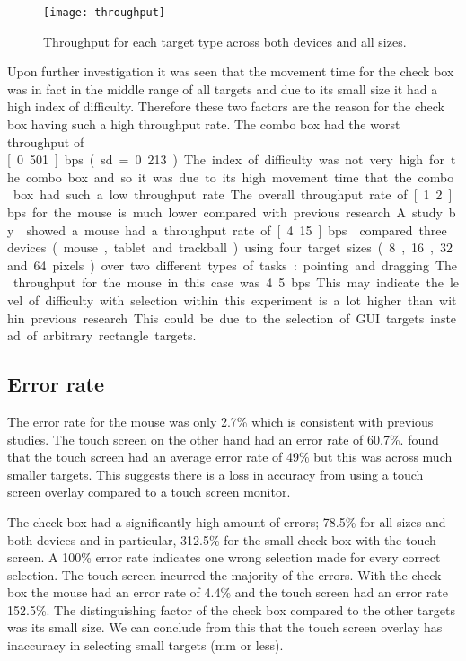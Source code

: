 \documentclass{elsart}
\begin{document}
\begin{figure}
	\texttt{[image: throughput]}
	\caption{Throughput for each target type across both devices and all
	sizes.}
	\label{fig-throughput}
\end{figure}

Upon further investigation it was seen that the movement time for the
check box was in fact in the middle range of all targets and due to its
small size it had a high index of difficulty. Therefore these two
factors are the reason for the check box having such a high throughput
rate. The combo box had the worst throughput of \unit[0.501]{bps} (sd =
0.213). The index of difficulty was not very high for the combo box and
so it was due to its high movement time that the combo box had such a
low throughput rate.

The overall throughput rate of \unit[1.2]{bps} for the mouse is much
lower compared with previous research. A study by
\citet{Doug-SA-1994-SIGCHI} showed a mouse had a throughput rate of
\unit[4.15]{bps}. \citet{Mack-IS-1991} compared three devices (mouse,
tablet and trackball) using four target sizes (8, 16, 32 and 64 pixels)
over two different types of tasks: pointing and dragging. The throughput
for the mouse in this case was 4.5 bps. This may indicate the level of
difficulty with selection within this experiment is a lot higher than
within previous research. This could be due to the selection of GUI
targets instead of arbitrary rectangle targets.

\subsection{Error rate}
\label{sec-results-errorrate}

The error rate for the mouse was only 2.7\% which is consistent with
previous studies. The touch screen on the other hand had an error rate
of 60.7\%. \citet{Sear-A-1991-IJMMS} found that the touch screen had
an average error rate of 49\% but this was across much smaller targets.
This suggests there is a loss in accuracy from using a touch screen
overlay compared to a touch screen monitor.

The check box had a significantly high amount of errors; 78.5\% for all
sizes and both devices and in particular, 312.5\% for the small check box
with the touch screen. A 100\% error rate indicates one wrong selection
made for every correct selection. The touch screen incurred the majority
of the errors. With the check box the mouse had an error rate of 4.4\%
and the touch screen had an error rate 152.5\%. The distinguishing factor
of the check box compared to the other targets was its small size. We
can conclude from this that the touch screen overlay has inaccuracy in
selecting small targets (\unit[4]{mm} or less).
\end{document}
